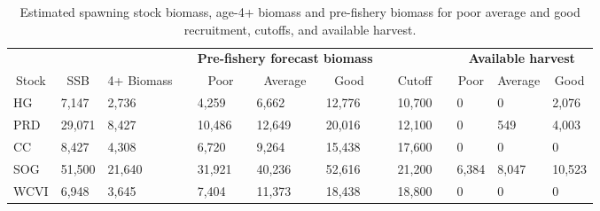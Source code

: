 %
\begin{table}[!tbp]
 \small
 \caption{Estimated spawning stock biomass,  age-4+ biomass and pre-fishery
			biomass for poor average and good recruitment,  cutoffs,  and 
			available harvest.\label{TableCatchAdvice}} 
 \begin{center}
 \begin{tabular}{lllclllclclll}\hline\hline
\multicolumn{3}{c}{\bfseries }&
\multicolumn{1}{c}{\bfseries }&
\multicolumn{3}{c}{\bfseries Pre-fishery forecast biomass}&
\multicolumn{1}{c}{\bfseries }&
\multicolumn{1}{c}{\bfseries }&
\multicolumn{1}{c}{\bfseries }&
\multicolumn{3}{c}{\bfseries Available harvest}
\tabularnewline \cline{1-13}
\multicolumn{1}{c}{Stock}&\multicolumn{1}{c}{SSB}&\multicolumn{1}{c}{4+ Biomass}&\multicolumn{1}{c}{}&\multicolumn{1}{c}{Poor}&\multicolumn{1}{c}{Average}&\multicolumn{1}{c}{Good}&\multicolumn{1}{c}{}&\multicolumn{1}{c}{Cutoff}&\multicolumn{1}{c}{}&\multicolumn{1}{c}{Poor}&\multicolumn{1}{c}{Average}&\multicolumn{1}{c}{Good}\tabularnewline
\hline
HG& 7,147& 2,736&& 4,259& 6,662&12,776&&10,700&&     0&     0& 2,076\tabularnewline
PRD&29,071& 8,427&&10,486&12,649&20,016&&12,100&&     0&   549& 4,003\tabularnewline
CC& 8,427& 4,308&& 6,720& 9,264&15,438&&17,600&&     0&     0&     0\tabularnewline
SOG&51,500&21,640&&31,921&40,236&52,616&&21,200&& 6,384& 8,047&10,523\tabularnewline
WCVI& 6,948& 3,645&& 7,404&11,373&18,438&&18,800&&     0&     0&     0\tabularnewline
\hline
\end{tabular}

\end{center}

\end{table}

